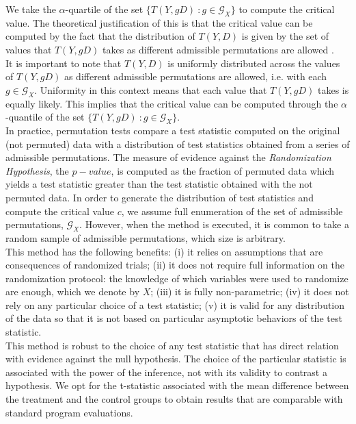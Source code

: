 \indent We take the $\alpha$-quartile of the set $\{ T(Y,gD)\ : g \in \mathcal{G}_{X} \}$ to compute the critical value. The theoretical justification of this is that the critical value can be computed by the fact that the distribution of $T(Y,D)$ is given by the set of values that $T(Y,gD)$ takes as different admissible permutations are allowed \citep[see][Theorem 15.2.2]{romano2005exact}.\\
\indent It is important to note that $T(Y,D)$ is uniformly distributed across the values of $T(Y,gD)$ as different admissible permutations are allowed, i.e. with each $g \in \mathcal{G}_{X}$. Uniformity in this context means that each value that $T(Y,gD)$ takes is equally likely. This implies that the critical value can be computed through the $\alpha$-quantile of the set $\{ T(Y,gD)\ : g \in \mathcal{G}_{X} \}$.\\
\indent In practice, permutation tests compare a test statistic computed on the original (not permuted) data with a distribution of test statistics obtained from a series of admissible permutations. The measure of evidence against the \emph{Randomization Hypothesis}, the $p-value$, is computed as the fraction of permuted data which yields a test statistic greater than the test statistic obtained with the not permuted data. In order to generate the distribution of test statistics and compute the critical value $c$, we assume full enumeration of the set of admissible permutations, $\mathcal{G}_{X}$. However, when the method is executed, it is common to take a random sample of admissible permutations, which size is arbitrary.\\
\indent This method has the following benefits: (i) it relies on assumptions that are consequences of randomized trials; (ii) it does not require full information on the randomization protocol: the knowledge of which variables were used to randomize are enough, which we denote by $X$; (iii) it is fully non-parametric; (iv) it does not rely on any particular choice of a test statistic; (v) it is valid for any distribution of the data so that it is not based on particular asymptotic behaviors of the test statistic.\\
\indent This method is robust to the choice of any test statistic that has direct relation with evidence against the null hypothesis. The choice of the particular statistic is associated with the power of the inference, not with its validity to contrast a hypothesis. We opt for the t-statistic associated with the mean difference between the treatment and the control groups to obtain results that are comparable with standard program evaluations.\\